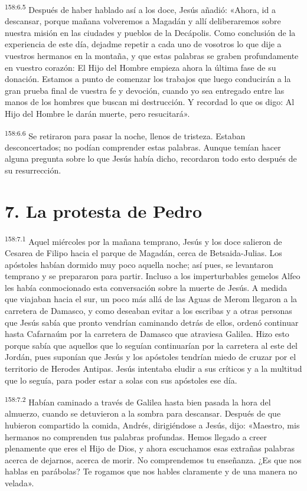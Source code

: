 \par 
\textsuperscript{158:6.5} Después de haber hablado así a los doce, Jesús añadió: «Ahora, id a descansar, porque mañana volveremos a Magadán y allí deliberaremos sobre nuestra misión en las ciudades y pueblos de la Decápolis. Como conclusión de la experiencia de este día, dejadme repetir a cada uno de vosotros lo que dije a vuestros hermanos en la montaña, y que estas palabras se graben profundamente en vuestro corazón: El Hijo del Hombre empieza ahora la última fase de su donación. Estamos a punto de comenzar los trabajos que luego conducirán a la gran prueba final de vuestra fe y devoción, cuando yo sea entregado entre las manos de los hombres que buscan mi destrucción. Y recordad lo que os digo: Al Hijo del Hombre le darán muerte, pero resucitará».

\par 
\textsuperscript{158:6.6} Se retiraron para pasar la noche, llenos de tristeza. Estaban desconcertados; no podían comprender estas palabras. Aunque temían hacer alguna pregunta sobre lo que Jesús había dicho, recordaron todo esto después de su resurrección.

\section*{7. La protesta de Pedro}
\par 
\textsuperscript{158:7.1} Aquel miércoles por la mañana temprano, Jesús y los doce salieron de Cesarea de Filipo hacia el parque de Magadán, cerca de Betsaida-Julias. Los apóstoles habían dormido muy poco aquella noche; así pues, se levantaron temprano y se prepararon para partir. Incluso a los imperturbables gemelos Alfeo les había conmocionado esta conversación sobre la muerte de Jesús. A medida que viajaban hacia el sur, un poco más allá de las Aguas de Merom llegaron a la carretera de Damasco, y como deseaban evitar a los escribas y a otras personas que Jesús sabía que pronto vendrían caminando detrás de ellos, ordenó continuar hasta Cafarnaúm por la carretera de Damasco que atraviesa Galilea. Hizo esto porque sabía que aquellos que lo seguían continuarían por la carretera al este del Jordán, pues suponían que Jesús y los apóstoles tendrían miedo de cruzar por el territorio de Herodes Antipas. Jesús intentaba eludir a sus críticos y a la multitud que lo seguía, para poder estar a solas con sus apóstoles ese día.

\par 
\textsuperscript{158:7.2} Habían caminado a través de Galilea hasta bien pasada la hora del almuerzo, cuando se detuvieron a la sombra para descansar. Después de que hubieron compartido la comida, Andrés, dirigiéndose a Jesús, dijo: «Maestro, mis hermanos no comprenden tus palabras profundas. Hemos llegado a creer plenamente que eres el Hijo de Dios, y ahora escuchamos esas extrañas palabras acerca de dejarnos, acerca de morir. No comprendemos tu enseñanza. ¿Es que nos hablas en parábolas? Te rogamos que nos hables claramente y de una manera no velada».

